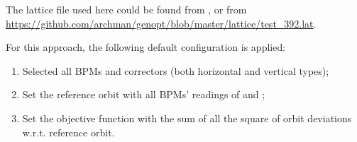 \documentclass[letterpaper,10pt,english]{sphinxmanual}
\begin{document}
\begin{sphinxVerbatim}[commandchars=\\\{\},formatcom=\scriptsize]
 

  
  

   


\end{sphinxVerbatim}

The lattice file used here could be found from
, or from \url{https://github.com/archman/genopt/blob/master/lattice/test\_392.lat}.

For this approach, the following default configuration is applied:
\begin{enumerate}
\item {} 
Selected all BPMs and correctors (both horizontal and vertical types);

\item {} 
Set the reference orbit with all BPMs' readings of  and ;

\item {} 
Set the objective function with the sum of all the square of orbit deviations w.r.t. reference orbit.

\end{enumerate}
\end{document}
